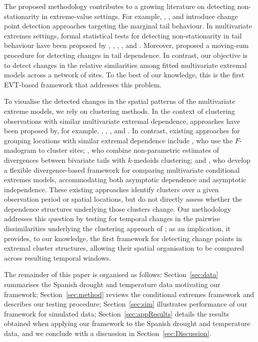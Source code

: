 \documentclass[APA,STIX1COL]{WileyNJD-v2}
\begin{document}
The proposed methodology contributes to a growing literature on detecting non-stationarity in extreme-value settings. For example, \cite{Dierckx2010}, \cite{dupuis2015detecting}, and \cite{girard2026changepoint} introduce change point detection approaches targeting the marginal tail behaviour. In multivariate extremes settings, formal statistical tests for detecting non-stationarity in tail behaviour have been proposed by \cite{Buecher2015}, \cite{Hoga2018}, \cite{Drees2023}, \cite{Hazra2025}, and \cite{Pawley2026}. Moreover, \citet{McGonigle2025} proposed a moving-sum procedure for detecting changes in tail dependence. In contrast, our objective is to detect changes in the relative similarities among fitted multivariate extremal models across a network of sites. To the best of our knowledge, this is the first EVT-based framework that addresses this problem.

To visualise the detected changes in the spatial patterns of the multivariate extreme models, we rely on clustering methods. In the context of clustering observations with similar multivariate extremal dependence, approaches have been proposed by, for example, \cite{jansen2020}, \cite{meyer2024multivariate}, \cite{talento2025canonical}, and \cite{alouini2026bayesian}. In contrast, existing approaches for grouping locations with similar extremal dependence include \cite{Bernard2013}, who use the $F$-madogram to cluster sites; \cite{Vignotto2021}, who combine non-parametric estimates of divergences between bivariate tails with $k$-medoids clustering; and \cite{OToole2026clustering}, who develop a flexible divergence-based framework for comparing multivariate conditional extremes models, accommodating both asymptotic dependence and asymptotic independence. These existing approaches identify clusters over a given observation period or spatial locations, but do not directly assess whether the dependence structures underlying those clusters change. Our methodology addresses this question by testing for temporal changes in the pairwise dissimilarities underlying the clustering approach of \cite{OToole2026clustering}; as an implication, it provides, to our knowledge, the first framework for detecting change points in extremal cluster structures, allowing their spatial organisation to be compared across resulting temporal windows.

The remainder of this paper is organised as follows: Section~\ref{sec:data} summarises the Spanish drought and temperature data motivating our framework; Section~\ref{sec:method} reviews the conditional extremes framework and describes our testing procedure; Section~\ref{sec:sim} illustrates performance of our framework for simulated data; Section~\ref{sec:appResults} details the results obtained when applying our framework to the Spanish drought and temperature data, and we conclude with a discussion in Section~\ref{sec:Discussion}.
\end{document}
